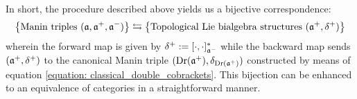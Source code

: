 In short, the procedure described above yields us a bijective correspondence:
    \begin{equation} \label{equation: manin_triple_lie_bialgebra_correspondence}
        \left\{ \text{Manin triples $(\mathfrak{a}, \mathfrak{a}^+, \mathfrak{a}^-)$} \right\} \leftrightarrows \left\{ \text{Topological Lie bialgebra structures $(\mathfrak{a}^+, \delta^+)$} \right\}
    \end{equation}
wherein the forward map is given by $\delta^+ := [\cdot, \cdot]^*_{\mathfrak{a}^-}$ while the backward map sends $(\mathfrak{a}^+, \delta^+)$ to the canonical  Manin triple $( \operatorname{Dr}(\mathfrak{a}^+), \delta_{\operatorname{Dr}(\mathfrak{a}^+)} )$ constructed by means of equation \eqref{equation: classical_double_cobrackets}. This bijection can be enhanced to an equivalence of categories in a straightforward manner.